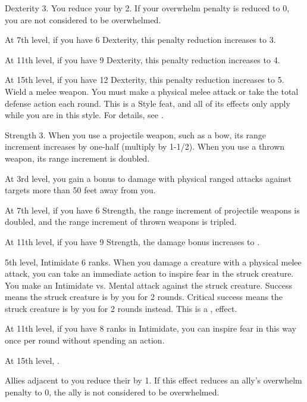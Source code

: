     \featpres Dexterity 3.
    \featben You reduce your  by 2.
    If your overwhelm penalty is reduced to 0, you are not considered to be overwhelmed.

    At 7th level, if you have 6 Dexterity, this penalty reduction increases to 3.

    At 11th level, if you have 9 Dexterity, this penalty reduction increases to 4.

    At 15th level, if you have 12 Dexterity, this penalty reduction increases to 5.
    \stylereq Wield a melee weapon. You must make a physical melee attack or take the total defense action each round.
     This is a Style feat, and all of its effects only apply while you are in this style.
    For details, see .

    \featpre Strength 3.
    \featben When you use a projectile weapon, such as a bow, its range increment increases by one-half (multiply by 1-1/2).
    When you use a thrown weapon, its range increment is doubled.

    At 3rd level, you gain a  bonus to damage with physical ranged attacks against targets more than 50 feet away from you.

    At 7th level, if you have 6 Strength, the range increment of projectile weapons is doubled, and the range increment of thrown weapons is tripled.

    At 11th level, if you have 9 Strength, the damage bonus increases to .

    \featpres 5th level, Intimidate 6 ranks.
    \featben When you damage a creature with a physical melee attack, you can take an immediate action to inspire fear in the struck creature.
    You make an Intimidate vs. Mental attack against the struck creature.
    Success means the struck creature is \shaken by you for 2 rounds.
    Critical success means the struck creature is \frightened by you for 2 rounds instead.
    This is a ,  effect.

    At 11th level, if you have 8 ranks in Intimidate, you can inspire fear in this way once per round without spending an action.

    At 15th level, \tdash.

    \featben Allies adjacent to you reduce their  by 1.
    If this effect reduces an ally's overwhelm penalty to 0, the ally is not considered to be overwhelmed.

